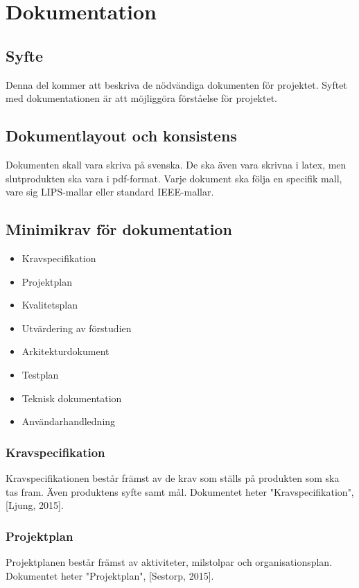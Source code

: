 \section{Dokumentation}

\subsection{Syfte}
Denna del kommer att beskriva de nödvändiga dokumenten för projektet. Syftet med dokumentationen är att möjliggöra förståelse för projektet.

\subsection{Dokumentlayout och konsistens}
Dokumenten skall vara skriva på svenska. De ska även vara skrivna i latex, men slutprodukten ska vara i pdf-format. Varje dokument ska följa en specifik mall, vare sig LIPS-mallar eller standard IEEE-mallar. 

\subsection{Minimikrav för dokumentation}
\begin{itemize}
\item Kravspecifikation
\item Projektplan
\item Kvalitetsplan
\item Utvärdering av förstudien
\item Arkitekturdokument
\item Testplan
\item Teknisk dokumentation
\item Användarhandledning
\end{itemize}

\subsubsection{Kravspecifikation}
Kravspecifikationen består främst av de krav som ställs på produkten som ska tas fram. Även produktens syfte samt mål. Dokumentet heter "Kravspecifikation", [Ljung, 2015].

\subsubsection{Projektplan}
Projektplanen består främst av aktiviteter, milstolpar och organisationsplan. Dokumentet heter "Projektplan", [Sestorp, 2015].

